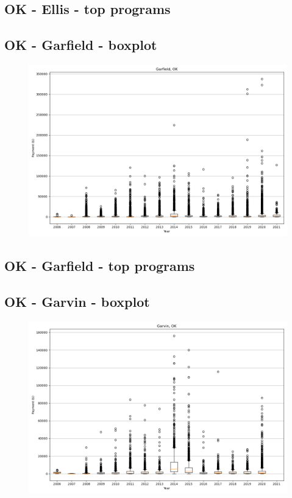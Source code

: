 \subsection*{OK - Ellis - top programs}

\newpage
\subsection*{OK - Garfield - boxplot}
\begin{figure}[h]
\centering
\includegraphics[width=7in]{../output/boxplots/counties/Garfield-OK_boxplot.png}
\end{figure}


\subsection*{OK - Garfield - top programs}

\newpage
\subsection*{OK - Garvin - boxplot}
\begin{figure}[h]
\centering
\includegraphics[width=7in]{../output/boxplots/counties/Garvin-OK_boxplot.png}
\end{figure}


